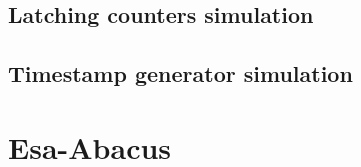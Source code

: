 \subsection{Latching counters simulation}

\subsection{Timestamp generator simulation}

\section{Esa-Abacus}